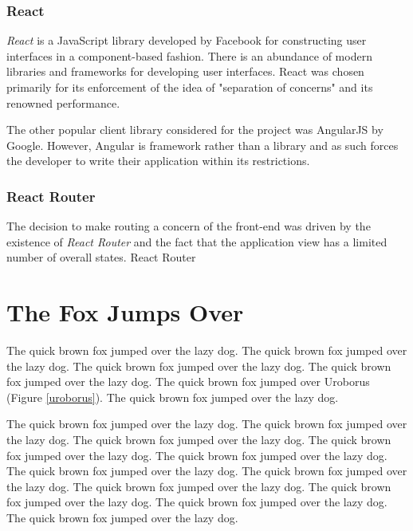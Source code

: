 \documentclass{l4proj}
\begin{document}
        \subsubsection{React}
        \textit{React} is a JavaScript library developed by Facebook for constructing user interfaces in a component-based fashion. There is an abundance of modern libraries and frameworks for developing user interfaces. React was chosen primarily for its enforcement of the idea of "separation of concerns" and its renowned performance.
        
        The other popular client library considered for the project was AngularJS by Google. However, Angular is framework rather than a library and as such forces the developer to write their application within its restrictions.

        \subsubsection{React Router}
        The decision to make routing a concern of the front-end was driven by the existence of \textit{React Router} and the fact that the application view has a limited number of overall states. React Router




\section{The Fox Jumps Over}
The quick brown fox jumped over the lazy dog.
The quick brown fox jumped over the lazy dog.
The quick brown fox jumped over the lazy dog.
The quick brown fox jumped over the lazy dog.
The quick brown fox jumped over Uroborus (Figure \ref{uroborus}).
The quick brown fox jumped over the lazy dog.

The quick brown fox jumped over the lazy dog.
The quick brown fox jumped over the lazy dog.
The quick brown fox jumped over the lazy dog.
The quick brown fox jumped over the lazy dog.
The quick brown fox jumped over the lazy dog.
The quick brown fox jumped over the lazy dog.
The quick brown fox jumped over the lazy dog.
The quick brown fox jumped over the lazy dog.
The quick brown fox jumped over the lazy dog.
The quick brown fox jumped over the lazy dog.
The quick brown fox jumped over the lazy dog.
\end{document}
